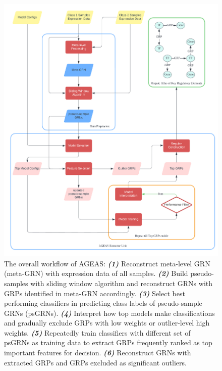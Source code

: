 \documentclass[fleqn,10pt]{wlscirep}
\begin{document}
\begin{figure}[ht]
  \centering
  \includegraphics[width=0.8\linewidth, keepaspectratio,]{../images/summary_trans.png}
  \caption{
    The overall workflow of AGEAS:
    \textbf{\emph{(1)}} Reconstruct meta-level GRN (meta-GRN) with expression data of all samples.
    \textbf{\emph{(2)}} Build pseudo-samples with sliding window algorithm and reconstruct GRNs with GRPs identified in meta-GRN accordingly.
    \textbf{\emph{(3)}} Select best performing classifiers in predicting class labels of pseudo-sample GRNs (psGRNs).
    \textbf{\emph{(4)}} Interpret how top models make classifications and gradually exclude GRPs with low weights or outlier-level high weights.
    \textbf{\emph{(5)}} Repeatedly train classifiers with different set of psGRNs as training data to extract GRPs frequently ranked as top important features for decision.
    \textbf{\emph{(6)}} Reconstruct GRNs with extracted GRPs and GRPs excluded as significant outliers.
  }
  \label{workflow}
\end{figure}
\end{document}
